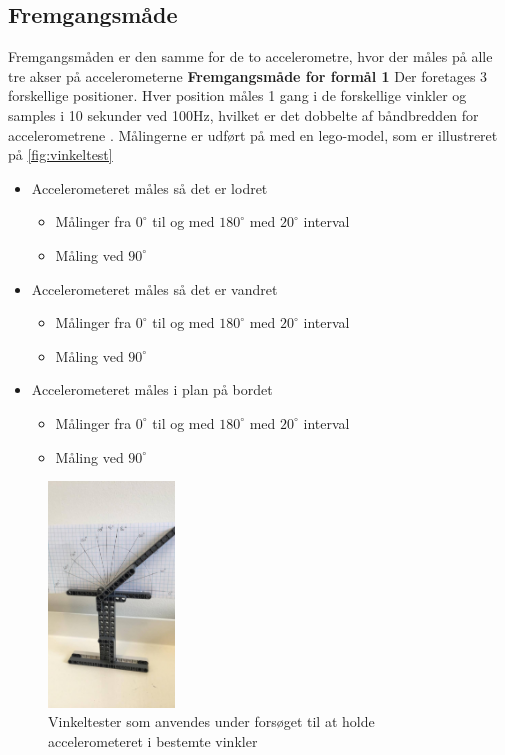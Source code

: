 \subsection{Fremgangsmåde} 
Fremgangsmåden er den samme for de to accelerometre, hvor der måles på alle tre akser på accelerometerne 
\textbf{Fremgangsmåde for formål 1} \label{vinkel_fremgangsmaade}
Der foretages 3 forskellige positioner. Hver position måles 1 gang i de forskellige vinkler og samples i 10 sekunder ved 100Hz, hvilket er det dobbelte af båndbredden for accelerometrene \citep{analogdevices2010}. Målingerne er udført på med en lego-model, som er illustreret på \autoref{fig:vinkeltest}
\begin{itemize}
\item Accelerometeret måles så det er lodret
\begin{itemize}
\item Målinger fra $0^{\circ}$ til og med $180^{\circ}$ med $20^{\circ}$ interval 
\item Måling ved $90^{\circ}$  
\end{itemize}
\item Accelerometeret måles så det er vandret
\begin{itemize}
\item Målinger fra $0^{\circ}$ til og med $180^{\circ}$ med $20^{\circ}$ interval 
\item Måling ved $90^{\circ}$  
\end{itemize}
\item Accelerometeret måles i plan på bordet
\begin{itemize}
\item Målinger fra $0^{\circ}$ til og med $180^{\circ}$ med $20^{\circ}$ interval 
\item Måling ved $90^{\circ}$  
\end{itemize}
\end{itemize}


\begin{figure}[H]
\centering
\includegraphics[width=0.3\textwidth]{figures/vinkeltest}
\caption{Vinkeltester som anvendes under forsøget til at holde accelerometeret i bestemte vinkler}
\label{fig:vinkeltest}
\end{figure}

